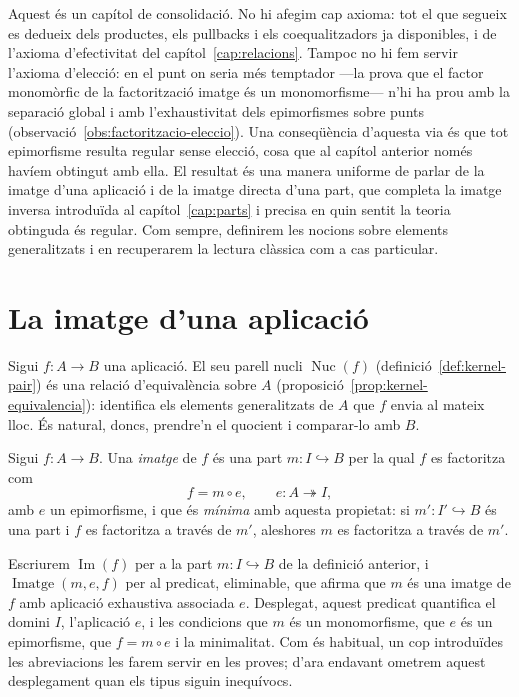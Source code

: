 Aquest és un capítol de consolidació. No hi afegim cap axioma: tot el que
segueix es dedueix dels productes, els pullbacks i els coequalitzadors ja
disponibles, i de l'axioma d'efectivitat del
capítol~\ref{cap:relacions}. Tampoc no hi fem servir l'axioma d'elecció:
en el punt on seria més temptador ---la prova que el factor monomòrfic de
la factorització imatge és un monomorfisme--- n'hi ha prou amb la
separació global i amb l'exhaustivitat dels epimorfismes sobre punts
(observació~\ref{obs:factoritzacio-eleccio}). Una conseqüència
d'aquesta via és que tot epimorfisme resulta regular sense elecció, cosa
que al capítol anterior només havíem obtingut amb ella. El resultat és
una manera uniforme de parlar
de la imatge d'una aplicació i de la imatge directa d'una part, que
completa la imatge inversa introduïda al capítol~\ref{cap:parts} i precisa
en quin sentit la teoria obtinguda és regular. Com sempre, definirem les
nocions sobre elements generalitzats i en recuperarem la lectura clàssica
com a cas particular.

\section{La imatge d'una aplicació}\label{sec:imatge}

Sigui \(f\colon A\to B\) una aplicació. El seu parell nucli
\(\operatorname{Nuc}(f)\) (definició~\ref{def:kernel-pair}) és una relació
d'equivalència sobre \(A\) (proposició~\ref{prop:kernel-equivalencia}):
identifica els elements generalitzats de \(A\) que \(f\) envia al mateix
lloc. És natural, doncs, prendre'n el quocient i comparar-lo amb \(B\).

\begin{definicio}\label{def:imatge}
Sigui \(f\colon A\to B\). Una \emph{imatge} de \(f\) és una part
\(m\colon I\hookrightarrow B\) per la qual \(f\) es factoritza com
\[
f=m\circ e,
\qquad
e\colon A\twoheadrightarrow I,
\]
amb \(e\) un epimorfisme, i que és \emph{mínima} amb aquesta propietat: si
\(m'\colon I'\hookrightarrow B\) és una part i \(f\) es factoritza a
través de \(m'\), aleshores \(m\) es factoritza a través de \(m'\).
\end{definicio}

\begin{notacio}[La imatge]\label{not:imatge}
Escriurem \(\operatorname{Im}(f)\) per a la part \(m\colon
I\hookrightarrow B\) de la definició anterior, i
\(\operatorname{Imatge}(m,e,f)\) per al predicat, eliminable, que afirma
que \(m\) és una imatge de \(f\) amb aplicació exhaustiva associada
\(e\). Desplegat, aquest predicat quantifica el domini \(I\), l'aplicació
\(e\), i les condicions que \(m\) és un monomorfisme, que \(e\) és un
epimorfisme, que \(f=m\circ e\) i la minimalitat. Com és habitual, un cop
introduïdes les abreviacions les farem servir en les proves; d'ara
endavant ometrem aquest desplegament quan els tipus siguin inequívocs.
\end{notacio}

